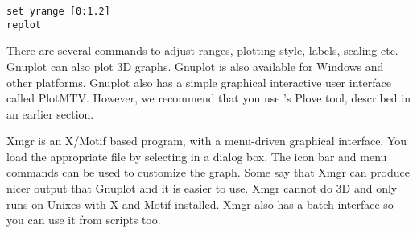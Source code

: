 \begin{verbatim}
set yrange [0:1.2]
replot
\end{verbatim}


There are several commands to adjust ranges, plotting style, labels,
scaling etc. Gnuplot can also plot 3D graphs. Gnuplot
is also available for Windows and other platforms. Gnuplot also
has a simple graphical interactive user interface called PlotMTV.
However, we recommend that you use {\opp}'s Plove tool, described in
an earlier section.


Xmgr is an X/Motif based program, with a menu-driven
graphical interface. You load the appropriate file by selecting in a
dialog box. The icon bar and menu commands can be used to customize
the graph. Some say that Xmgr can produce nicer output that Gnuplot
and it is easier to use. Xmgr cannot do 3D and only runs on Unixes
with X and Motif installed. Xmgr also has a batch interface so you can
use it from scripts too.



